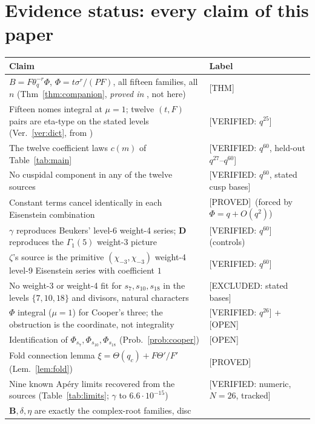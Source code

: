 \documentclass[11pt,reqno]{amsart}
\theoremstyle{plain}
\theoremstyle{definition}
\theoremstyle{remark}
\newcommand{\thq}{\theta_q}
\newcommand{\chim}[1]{\chi_{-#1}}
\newcommand{\Thm}{\textup{\textsf{[THM]}}}
\newcommand{\Proved}{\textup{\textsf{[PROVED]}}}
\newcommand{\VerifiedR}[1]{\textup{\textsf{[VERIFIED: #1]}}}
\newcommand{\ExcludedR}[1]{\textup{\textsf{[EXCLUDED: #1]}}}
\newcommand{\Open}{\textup{\textsf{[OPEN]}}}
\begin{document}
\section{Evidence status: every claim of this paper}
\label{sec:status}

\begin{center}
\renewcommand{\arraystretch}{1.3}
\begin{tabular}{@{}>{\raggedright\arraybackslash}p{9.1cm} l@{}}
\toprule
Claim & Label\\
\midrule
$B=F\thq^{-r}\Phi$, $\Phi=t\sigma^r/(PF)$, all fifteen families, all $n$
(Thm~\ref{thm:companion}, \emph{proved in} \cite{anchors}, not here)
& \Thm\\
Fifteen nomes integral at $\mu=1$; twelve $(t,F)$ pairs are eta-type on the
stated levels (Ver.~\ref{ver:dict}, from \cite{dict})
& \VerifiedR{$q^{25}$}\\
The twelve coefficient laws $c(m)$ of Table~\ref{tab:main}
& \VerifiedR{$q^{60}$, held-out $q^{27}$--$q^{60}$}\\
No cuspidal component in any of the twelve sources
& \VerifiedR{$q^{60}$, stated cusp bases}\\
Constant terms cancel identically in each Eisenstein combination
& \Proved\ (forced by $\Phi=q+O(q^2)$)\\
$\gamma$ reproduces Beukers' level-6 weight-4 series; $\mathbf D$
reproduces the $\Gamma_1(5)$ weight-3 picture
& \VerifiedR{$q^{60}$} (controls)\\
$\zeta$'s source is the primitive $(\chim3,\chim3)$ weight-4 level-9
Eisenstein series with coefficient $1$
& \VerifiedR{$q^{60}$}\\
No weight-3 or weight-4 fit for $s_7,s_{10},s_{18}$ in the levels
$\{7,10,18\}$ and divisors, natural characters
& \ExcludedR{stated bases}\\
$\Phi$ integral ($\mu=1$) for Cooper's three; the obstruction is the
coordinate, not integrality
& \VerifiedR{$q^{26}$} + \Open\\
Identification of $\Phi_{s_7},\Phi_{s_{10}},\Phi_{s_{18}}$ (Prob.~\ref{prob:cooper})
& \Open\\
Fold connection lemma $\xi=\Theta(q_c)+F\Theta'/F'$ (Lem.~\ref{lem:fold})
& \Proved\\
Nine known Ap\'ery limits recovered from the sources
(Table~\ref{tab:limits}; $\gamma$ to $6.6\cdot10^{-15}$)
& \VerifiedR{numeric, $N=26$, tracked}\\
$\mathbf B,\delta,\eta$ are exactly the complex-root families, disc

\end{tabular}
\end{center}
\end{document}
